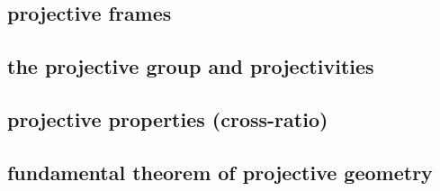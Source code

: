 \subsection{projective frames}
\subsection{the projective group and projectivities}
\subsection{projective properties (cross-ratio)}
\subsection{fundamental theorem of projective geometry}

